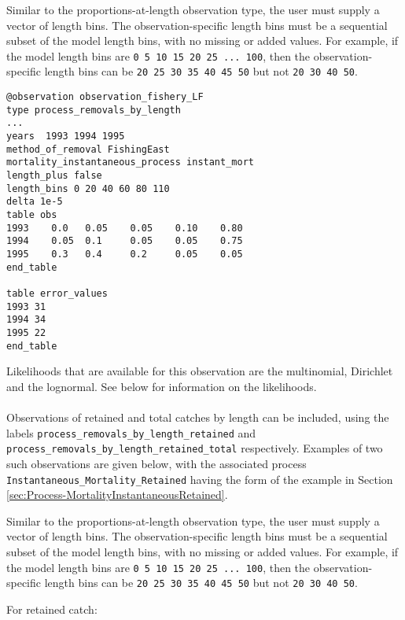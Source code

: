 \begin{itemize}
Similar to the proportions-at-length observation type, the user must supply a vector of length bins. The observation-specific length bins must be a sequential subset of the model length bins, with no missing or added values. For example, if the model length bins are \texttt{0 5 10 15 20 25 ... 100}, then the observation-specific length bins can be \texttt{20 25 30 35 40 45 50} but not \texttt{20 30 40 50}.

{\small{\begin{verbatim}
@observation observation_fishery_LF
type process_removals_by_length
...
years  1993 1994 1995
method_of_removal FishingEast
mortality_instantaneous_process instant_mort
length_plus false
length_bins 0 20 40 60 80 110
delta 1e-5
table obs
1993    0.0   0.05    0.05    0.10    0.80
1994    0.05  0.1     0.05    0.05    0.75
1995    0.3   0.4     0.2     0.05    0.05
end_table

table error_values
1993 31
1994 34
1995 22
end_table
\end{verbatim}}}

Likelihoods that are available for this observation are the multinomial, Dirichlet and the lognormal. See below for information on the likelihoods.

\paragraph*{}\label{sec:Observation-ProcessRemovalsByLengthRetained}\label{sec:Observation-ProcessRemovalsByLengthRetainedTotal}

Observations of retained and total catches by length can be included, using the labels \texttt{process\_removals\_by\_length\_retained} and \texttt{process\_removals\_by\_length\_retained\_total} respectively. Examples of two such observations are given below, with the associated process \texttt{Instantaneous\_Mortality\_Retained} having the form of the example in Section \ref{sec:Process-MortalityInstantaneousRetained}.

Similar to the proportions-at-length observation type, the user must supply a vector of length bins. The observation-specific length bins must be a sequential subset of the model length bins, with no missing or added values. For example, if the model length bins are \texttt{0 5 10 15 20 25 ... 100}, then the observation-specific length bins can be \texttt{20 25 30 35 40 45 50} but not \texttt{20 30 40 50}.

For retained catch:


\end{itemize}

